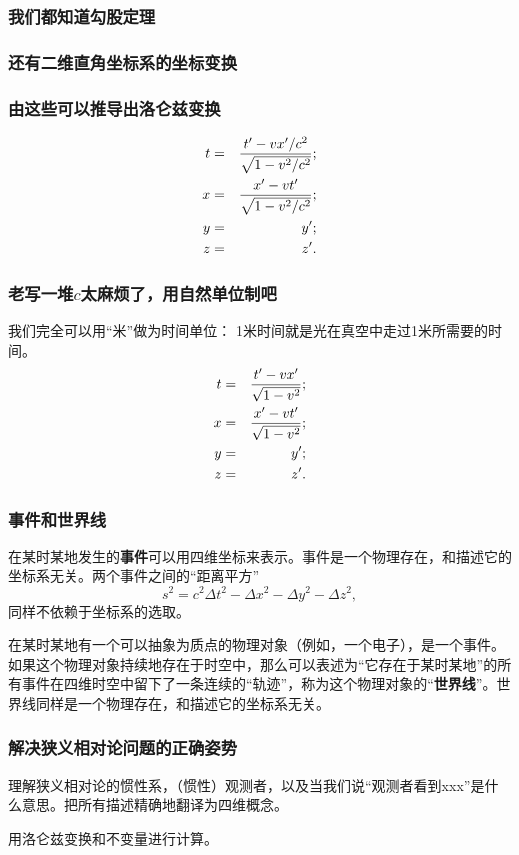 \documentclass[CJK,13pt]{beamer}
\date{}
\begin{document}
  \bch
{}


\begin{frame}
  \frametitle{我们都知道勾股定理}
\end{frame}


\begin{frame}
  \frametitle{还有二维直角坐标系的坐标变换}
\end{frame}


\begin{frame}
  \frametitle{由这些可以推导出洛仑兹变换}
  \begin{eqnarray}
  t&=&\frac{t'-vx'/c^2}{\sqrt{1-v^2/c^2}}; \nonumber \\
  x&=&\frac{x'-vt'}{\sqrt{1-v^2/c^2}}; \nonumber \\
  y&=&y'; \nonumber \\
  z&=&z'. \nonumber
  \end{eqnarray}
\end{frame}


\begin{frame}
  \frametitle{老写一堆$c$太麻烦了，用自然单位制吧}
  我们完全可以用``米''做为时间单位： 1米时间就是光在真空中走过1米所需要的时间。
  \begin{eqnarray}
  t&=&\frac{t'-vx'}{\sqrt{1-v^2}}; \nonumber \\
  x&=&\frac{x'-vt'}{\sqrt{1-v^2}}; \nonumber \\
  y&=&y'; \nonumber \\
  z&=&z'. \nonumber
  \end{eqnarray}
\end{frame}

\begin{frame}
  \frametitle{事件和世界线}
  \bitem
  \item{在某时某地发生的{\bf 事件}可以用四维坐标来表示。事件是一个物理存在，和描述它的坐标系无关。两个事件之间的``距离平方'' $$s^2= c^2\Delta t^2 - \Delta x^2 -\Delta y^2-\Delta z^2,$$同样不依赖于坐标系的选取。}
  \item{在某时某地有一个可以抽象为质点的物理对象（例如，一个电子），是一个事件。如果这个物理对象持续地存在于时空中，那么可以表述为``它存在于某时某地''的所有事件在四维时空中留下了一条连续的“轨迹”，称为这个物理对象的“{\bf 世界线}”。世界线同样是一个物理存在，和描述它的坐标系无关。}
    \eitem
\end{frame}




\begin{frame}
  \frametitle{解决狭义相对论问题的正确姿势}
  \bitem
\item{理解狭义相对论的惯性系，（惯性）观测者，以及当我们说“观测者看到xxx”是什么意思。把所有描述精确地翻译为四维概念。}
\item{用洛仑兹变换和不变量进行计算。}
  \eitem

\end{frame}
\end{document}
